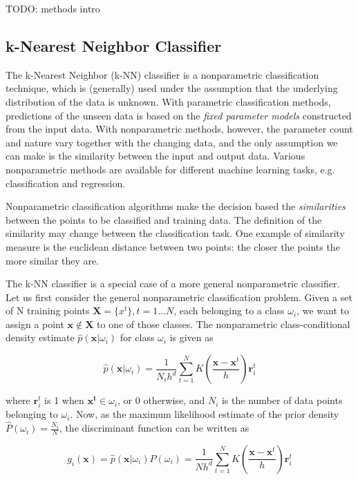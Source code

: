 TODO: methods intro

\subsection{k-Nearest Neighbor Classifier}
The k-Nearest Neighbor (k-NN) classifier is a nonparametric classification technique, which is (generally) used under the assumption that the underlying distribution of the data is unknown. With parametric classification methods, predictions of the unseen data is based on the \emph{fixed parameter models} constructed from the input data. With nonparametric methods, however, the parameter count and nature vary together with the changing data, and the only assumption we can make is the similarity between the input and output data. Various nonparametric methods are available for different machine learning tasks, e.g. classification and regression. \cite{alpaydin:2004:introduction} %

Nonparametric classification algorithms make the decision based the \emph{similarities} between the points to be classified and training data. The definition of the similarity may change between the classification task. One example of similarity measure is the euclidean distance between two points: the closer the points the more similar they are.

The k-NN classifier is a special case of a more general nonparametric classifier. Let us first consider the general nonparametric classification problem. Given a set of N training points  $\mathbf{X} = \{x^{t}\}, t=1...N$, each belonging to a class $\omega_{i}$, we want to assign a point $\mathbf{x} \notin \mathbf{X}$ to one of those classes. The nonparametric class-conditional density estimate $\hat{p}(\mathbf{x} | \omega_{i})$ for class $\omega_{i}$ is given as

\begin{equation*}
  \label{eq:1}
  \hat{p}(\mathbf{x} | \omega_{i}) = \frac{1}{N_{i}h^{d}} \sum_{t=1}^{N}K(\frac{\mathbf{x} - \mathbf{x}^{t}}{h})\mathbf{r}_{i}^{t}
\end{equation*}

where $\mathbf{r}_{i}^{t}$ is 1 when $\mathbf{x^t} \in \omega_{i}$, or 0 otherwise, and $N_{i}$ is the number of data points belonging to $\omega_{i}$. Now, as the maximum likelihood estimate of the prior density $\hat{P}(\omega_{i}) = \frac{N_{i}}{N}$, the discriminant function can be written as

\begin{equation*}
  \label{eq:2}
  g_{i}(\mathbf{x}) = \hat{p}(\mathbf{x}|\omega_{i}) \hat{P}(\omega_{i})
                    = \frac{1}{Nh^{d}} \sum_{t=1}^{N}K(\frac{\mathbf{x} - \mathbf{x}^{t}}{h})\mathbf{r}_{i}^{t}
\end{equation*}

